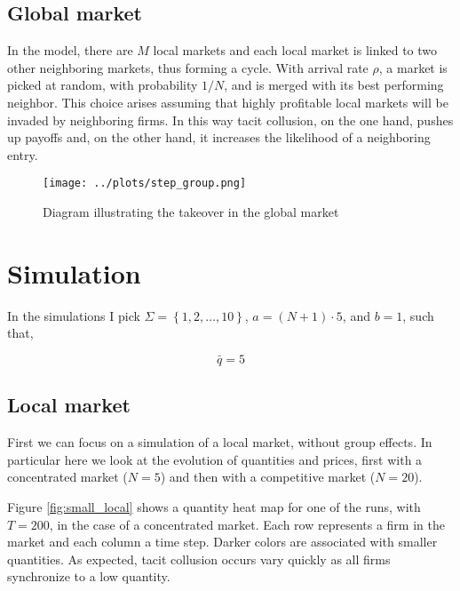\documentclass[american]{scrartcl}
\newcommand{\set}[1]{\left\{#1\right\}}
\begin{document}
\subsection{Global market}

In the model, there are $M$ local markets and each local market is linked to two other neighboring markets, thus forming a cycle. With arrival rate $\rho$, a market is picked at random, with probability $1 / N$, and is merged with its best performing neighbor. This choice arises assuming that highly profitable local markets will be invaded by neighboring firms. In this way tacit collusion, on the one hand, pushes up payoffs and, on the other hand, it increases the likelihood of a neighboring entry.



\begin{center}
    \begin{figure}[H]
        \center
        \texttt{[image: ../plots/step\_group.png]}
        \caption{Diagram illustrating the takeover in the global market}
        \label{fig:diagram}
    \end{figure}
\end{center}


\section{Simulation}

In the simulations I pick $\Sigma = \set{1, 2, \ldots, 10}$, $a = (N + 1) \cdot 5$, and $b = 1$, such that,

\begin{equation}
    \bar{q} = 5
\end{equation}

\subsection{Local market}

First we can focus on a simulation of a local market, without group effects. In particular here we look at the evolution of quantities and prices, first with a concentrated market ($N = 5$) and then with a competitive market ($N = 20$).

Figure \ref{fig:small_local} shows a quantity heat map for one of the runs, with $T = 200$, in the case of a concentrated market. Each row represents a firm in the market and each column a time step. Darker colors are associated with smaller quantities. As expected, tacit collusion occurs vary quickly as all firms synchronize to a low quantity.
\end{document}
